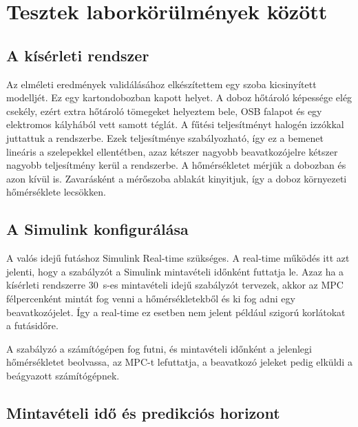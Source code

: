 \chapter{Tesztek laborkörülmények között}

\section{A kísérleti rendszer}
Az elméleti eredmények validálásához elkészítettem egy szoba kicsinyített modelljét. Ez egy kartondobozban kapott helyet. A doboz hőtároló képessége elég csekély, ezért extra hőtároló tömegeket helyeztem bele, OSB falapot és egy elektromos kályhából vett samott téglát.
A fűtési teljesítményt halogén izzókkal juttattuk a rendszerbe. Ezek teljesítménye szabályozható, így ez a bemenet lineáris a szelepekkel ellentétben, azaz kétszer nagyobb beavatkozójelre kétszer nagyobb teljesítmény kerül a rendszerbe.
A hőmérsékletet mérjük a dobozban és azon kívül is. Zavarásként a mérőszoba ablakát kinyitjuk, így a doboz környezeti hőmérséklete lecsökken.

\section{A Simulink konfigurálása}
A valós idejű futáshoz Simulink  Real-time szükséges. A real-time működés itt azt jelenti, hogy a szabályzót a Simulink mintavételi időnként futtatja le. Azaz ha a kísérleti rendszerre \SI{30}{\second}-es mintavételi idejű szabályzót tervezek, akkor az MPC félpercenként mintát fog venni a hőmérsékletekből és ki fog adni egy beavatkozójelet. Így a real-time ez esetben nem jelent például szigorú korlátokat a futásidőre.



A szabályzó a számítógépen fog futni, és mintavételi időnként a jelenlegi hőmérsékletet beolvassa, az MPC-t lefuttatja, a beavatkozó jeleket pedig elküldi a beágyazott számítógépnek.






\section{Mintavételi idő és predikciós horizont}

